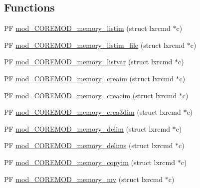 \subsection*{Functions}
\begin{DoxyCompactItemize}
\item 
P\+F \hyperlink{PIAACMCdesign_2src_2COREMOD__memory_2COREMOD__memory-util_8c_ac8d0f1f80414b71adbae2592d9ad4af5}{mod\+\_\+\+C\+O\+R\+E\+M\+O\+D\+\_\+memory\+\_\+listim} (struct lxrcmd $\ast$c)
\item 
P\+F \hyperlink{PIAACMCdesign_2src_2COREMOD__memory_2COREMOD__memory-util_8c_a8a114cc202662e53948d49cbd1c24215}{mod\+\_\+\+C\+O\+R\+E\+M\+O\+D\+\_\+memory\+\_\+listim\+\_\+file} (struct lxrcmd $\ast$c)
\item 
P\+F \hyperlink{PIAACMCdesign_2src_2COREMOD__memory_2COREMOD__memory-util_8c_a173fc6213f3d9b5e6564a1e3e33fbc8a}{mod\+\_\+\+C\+O\+R\+E\+M\+O\+D\+\_\+memory\+\_\+listvar} (struct lxrcmd $\ast$c)
\item 
P\+F \hyperlink{PIAACMCdesign_2src_2COREMOD__memory_2COREMOD__memory-util_8c_a85535a68fa2604715174985843da67dd}{mod\+\_\+\+C\+O\+R\+E\+M\+O\+D\+\_\+memory\+\_\+creaim} (struct lxrcmd $\ast$c)
\item 
P\+F \hyperlink{PIAACMCdesign_2src_2COREMOD__memory_2COREMOD__memory-util_8c_afb8072ed78b21728e71528e598c2e90d}{mod\+\_\+\+C\+O\+R\+E\+M\+O\+D\+\_\+memory\+\_\+creacim} (struct lxrcmd $\ast$c)
\item 
P\+F \hyperlink{PIAACMCdesign_2src_2COREMOD__memory_2COREMOD__memory-util_8c_a09f3a118a1210d0e15800f50eaf81e2c}{mod\+\_\+\+C\+O\+R\+E\+M\+O\+D\+\_\+memory\+\_\+crea3dim} (struct lxrcmd $\ast$c)
\item 
P\+F \hyperlink{PIAACMCdesign_2src_2COREMOD__memory_2COREMOD__memory-util_8c_a39875c37399e211d9c719151e13b5bb2}{mod\+\_\+\+C\+O\+R\+E\+M\+O\+D\+\_\+memory\+\_\+delim} (struct lxrcmd $\ast$c)
\item 
P\+F \hyperlink{PIAACMCdesign_2src_2COREMOD__memory_2COREMOD__memory-util_8c_a830b002e9da6d2dc3074d608c90196d7}{mod\+\_\+\+C\+O\+R\+E\+M\+O\+D\+\_\+memory\+\_\+delims} (struct lxrcmd $\ast$c)
\item 
P\+F \hyperlink{PIAACMCdesign_2src_2COREMOD__memory_2COREMOD__memory-util_8c_a5aaadd3c7687d102e2c4895034afd952}{mod\+\_\+\+C\+O\+R\+E\+M\+O\+D\+\_\+memory\+\_\+copyim} (struct lxrcmd $\ast$c)
\item 
P\+F \hyperlink{PIAACMCdesign_2src_2COREMOD__memory_2COREMOD__memory-util_8c_a34a6828fbc7ebc1a853f73cb22d424ec}{mod\+\_\+\+C\+O\+R\+E\+M\+O\+D\+\_\+memory\+\_\+mv} (struct lxrcmd $\ast$c)

\end{DoxyCompactItemize}
